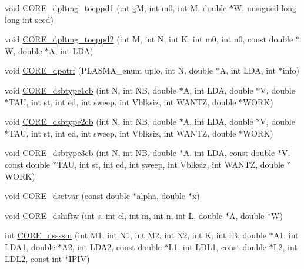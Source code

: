 \begin{DoxyCompactItemize}
\item 
void \hyperlink{group__CORE__double_gae47778b25933f0e1b13d1bce66d9f0c9_gae47778b25933f0e1b13d1bce66d9f0c9}{C\+O\+R\+E\+\_\+dpltmg\+\_\+toeppd1} (int g\+M, int m0, int M, double $\ast$W, unsigned long long int seed)
\item 
void \hyperlink{group__CORE__double_ga58e55cc51125622f0a4f8135fe1c9d81_ga58e55cc51125622f0a4f8135fe1c9d81}{C\+O\+R\+E\+\_\+dpltmg\+\_\+toeppd2} (int M, int N, int K, int m0, int n0, const double $\ast$W, double $\ast$A, int L\+D\+A)
\item 
void \hyperlink{group__CORE__double_ga0971d5ea439913fdb900931d6c7a0ad1_ga0971d5ea439913fdb900931d6c7a0ad1}{C\+O\+R\+E\+\_\+dpotrf} (P\+L\+A\+S\+M\+A\+\_\+enum uplo, int N, double $\ast$A, int L\+D\+A, int $\ast$info)
\item 
void \hyperlink{group__CORE__double_ga13d61f05b9ffab57ab8dc28a7d2f04ac_ga13d61f05b9ffab57ab8dc28a7d2f04ac}{C\+O\+R\+E\+\_\+dsbtype1cb} (int N, int N\+B, double $\ast$A, int L\+D\+A, double $\ast$V, double $\ast$T\+A\+U, int st, int ed, int sweep, int Vblksiz, int W\+A\+N\+T\+Z, double $\ast$W\+O\+R\+K)
\item 
void \hyperlink{group__CORE__double_gabd46a4aa466ef8c4e71f4d05b952f652_gabd46a4aa466ef8c4e71f4d05b952f652}{C\+O\+R\+E\+\_\+dsbtype2cb} (int N, int N\+B, double $\ast$A, int L\+D\+A, double $\ast$V, double $\ast$T\+A\+U, int st, int ed, int sweep, int Vblksiz, int W\+A\+N\+T\+Z, double $\ast$W\+O\+R\+K)
\item 
void \hyperlink{group__CORE__double_ga740babd14602b6a1bac2235bd34fff33_ga740babd14602b6a1bac2235bd34fff33}{C\+O\+R\+E\+\_\+dsbtype3cb} (int N, int N\+B, double $\ast$A, int L\+D\+A, const double $\ast$V, const double $\ast$T\+A\+U, int st, int ed, int sweep, int Vblksiz, int W\+A\+N\+T\+Z, double $\ast$W\+O\+R\+K)
\item 
void \hyperlink{group__CORE__double_ga470a57a47ccf26158cb24e925c850aca_ga470a57a47ccf26158cb24e925c850aca}{C\+O\+R\+E\+\_\+dsetvar} (const double $\ast$alpha, double $\ast$x)
\item 
void \hyperlink{group__CORE__double_gaa5faaea7077323e921ad2c92e12a15c1_gaa5faaea7077323e921ad2c92e12a15c1}{C\+O\+R\+E\+\_\+dshiftw} (int s, int cl, int m, int n, int L, double $\ast$A, double $\ast$W)
\item 
int \hyperlink{group__CORE__double_ga307f80b43bbc184b00aeac63931c28b2_ga307f80b43bbc184b00aeac63931c28b2}{C\+O\+R\+E\+\_\+dssssm} (int M1, int N1, int M2, int N2, int K, int I\+B, double $\ast$A1, int L\+D\+A1, double $\ast$A2, int L\+D\+A2, const double $\ast$L1, int L\+D\+L1, const double $\ast$L2, int L\+D\+L2, const int $\ast$I\+P\+I\+V)

\end{DoxyCompactItemize}
